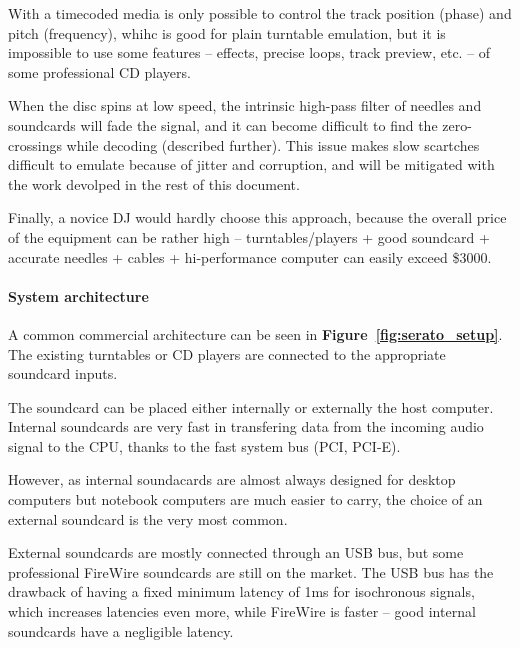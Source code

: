 \documentclass[a4paper,10pt]{article}
\begin{document}
\begin{multicols}{2}
With a timecoded media is only possible to control the track position (phase)
and pitch (frequency), whihc is good for plain turntable emulation, but it is
impossible to use some features -- effects, precise loops, track preview, etc.
-- of some professional CD players.

When the disc spins at low speed, the intrinsic high-pass filter of needles
and soundcards will fade the signal, and it can become difficult to find the
zero-crossings while decoding (described further). This issue makes slow
scartches difficult to emulate because of jitter and corruption, and will be
mitigated with the work devolped in the rest of this document.

Finally, a novice DJ would hardly choose this approach, because the overall
price of the equipment can be rather high -- turntables/players + good
soundcard + accurate needles + cables + hi-performance computer can easily
exceed \$3000. 


\paragraph{System architecture}
A common commercial architecture \cite{rane_ssl}\cite{ni_tsp} can be seen in
\textbf{Figure~\ref{fig:serato_setup}}. The existing turntables or CD players
are connected to the appropriate soundcard inputs.

The soundcard can be placed either internally or externally the host computer.
Internal soundcards are very fast in transfering data from the incoming audio
signal to the CPU, thanks to the fast system bus (PCI, PCI-E).

However, as internal soundacards are almost always designed for desktop
computers but notebook computers are much easier to carry, the choice of an
external soundcard is the very most common.

External soundcards are mostly connected through an USB bus, but some
professional FireWire soundcards are still on the market. The USB bus has the
drawback of having a fixed minimum latency of 1ms for isochronous signals,
which increases latencies even more, while FireWire is faster -- good internal
soundcards have a negligible latency.


\end{multicols}
\end{document}
